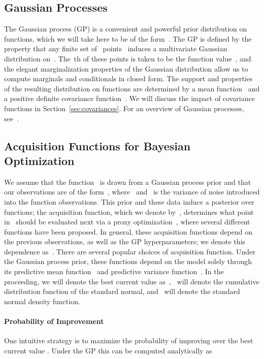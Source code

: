 \documentclass[aos,preprint]{imsart}
\begin{document}
\subsection{Gaussian Processes}
The Gaussian process (GP) is a convenient and powerful prior
distribution on functions, which we will take here to be of the
form~.  The GP is defined by the property that any
finite set of~ points~ induces a
multivariate Gaussian distribution on~.  The~th of these
points is taken to be the function value~, and the elegant
marginalization properties of the Gaussian distribution allow us to
compute marginals and conditionals in closed form.  The support and
properties of the resulting distribution on functions are determined
by a mean function~ and a positive definite
covariance function~.  We will discuss
the impact of covariance functions in Section~\ref{sec:covariances}.
For an overview of Gaussian processes, see~\citet{Rasmussen2006}.

\subsection{Acquisition Functions for Bayesian Optimization}
We assume that the function~ is drawn from a Gaussian
process prior and that our observations are of the
form~,
where~ and~ is the variance
of noise introduced into the function observations.  This prior and
these data induce a posterior over functions; the acquisition
function, which we denote by~, determines what
point in~ should be evaluated next via a proxy
optimization~, where
several different functions have been proposed.  In general, these
acquisition functions depend on the previous observations,
as well as the GP hyperparameters; we denote this dependence
as~.  There are several popular
choices of acquisition function.  Under the Gaussian process prior,
these functions depend on the model solely through its predictive mean
function~ and predictive
variance function~.  In
the proceeding, we will denote the best current value
as~,~
will denote the cumulative distribution function of the standard
normal, and~ will denote the standard normal density
function.

\paragraph{Probability of Improvement}
One intuitive strategy is to maximize the probability of improving
over the best current value \citep{kushner-1964a}.  Under the GP this
can be computed analytically as
\end{document}
